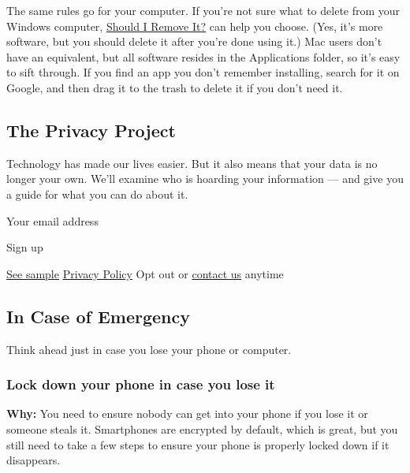 The same rules go for your computer. If you're not sure what to delete
from your Windows computer,
\href{https://www.shouldiremoveit.com/}{Should I Remove It?} can help
you choose. (Yes, it's more software, but you should delete it after
you're done using it.) Mac users don't have an equivalent, but all
software resides in the Applications folder, so it's easy to sift
through. If you find an app you don't remember installing, search for it
on Google, and then drag it to the trash to delete it if you don't need
it.

\hypertarget{the-privacy-project}{%
\subsection{The Privacy Project}\label{the-privacy-project}}

Technology has made our lives easier. But it also means that your data
is no longer your own. We'll examine who is hoarding your information
--- and give you a guide for what you can do about it.

Your email address

Sign up

\href{https://www.nytimes3xbfgragh.onion/newsletters/sample/real-estate}{See
sample} \textbar{}
\href{https://www.nytimes3xbfgragh.onion/content/help/rights/privacy/policy/privacy-policy.html}{Privacy
Policy} \textbar{} Opt out or
\href{https://www.nytimes3xbfgragh.onion/help/index.html}{contact us}
anytime

\hypertarget{in-case-of-emergency}{%
\subsection{In Case of Emergency}\label{in-case-of-emergency}}

Think ahead just in case you lose your phone or computer.~

\hypertarget{lock-down-your-phone-in-case-you-lose-it}{%
\subsubsection{Lock down your phone in case you lose
it}\label{lock-down-your-phone-in-case-you-lose-it}}

\textbf{Why:} You need to ensure nobody can get into your phone if you
lose it or someone steals it. Smartphones are encrypted by default,
which is great, but you still need to take a few steps to ensure your
phone is properly locked down if it disappears.~

